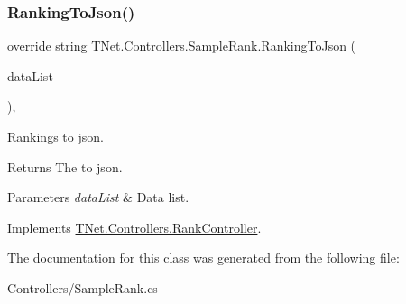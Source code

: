 \subsubsection{\texorpdfstring{Ranking\+To\+Json()}{RankingToJson()}}
{\footnotesize\ttfamily override string T\+Net.\+Controllers.\+Sample\+Rank.\+Ranking\+To\+Json (\begin{DoxyParamCaption}\item[{I\+List$<$ object $>$}]{data\+List }\end{DoxyParamCaption})\hspace{0.3cm}{\ttfamily [protected]}, {\ttfamily [virtual]}}



Rankings to json. 

\begin{DoxyReturn}{Returns}
The to json.
\end{DoxyReturn}

\begin{DoxyParams}{Parameters}
{\em data\+List} & Data list.\\
\hline
\end{DoxyParams}


Implements \mbox{\hyperlink{class_t_net_1_1_controllers_1_1_rank_controller_a61adb0bb3db269494ac6c71f6a1f7c27}{T\+Net.\+Controllers.\+Rank\+Controller}}.



The documentation for this class was generated from the following file\+:\begin{DoxyCompactItemize}
\item 
Controllers/Sample\+Rank.\+cs\end{DoxyCompactItemize}
